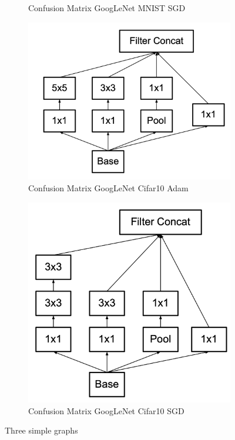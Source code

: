 \documentclass[conference]{IEEEtran}
\begin{document}
\begin{figure}[!htbp]
\begin{subfigure}[b]{0.22\textwidth}
        \caption{Confusion Matrix GoogLeNet MNIST SGD}
        \label{fig:x matrix_GoogLeNet_MNIST_SGD}
    \end{subfigure}
    \begin{subfigure}[b]{0.22\textwidth}
        \centering
        \includegraphics[width=\textwidth]{img/inceptionv1.png}
        \caption{Confusion Matrix GoogLeNet Cifar10 Adam}
        \label{fig:x matrix_GoogLeNet_CIFAR_Adam}
    \end{subfigure}
    \hfill
    \begin{subfigure}[b]{0.22\textwidth}
        \centering
        \includegraphics[width=\textwidth]{img/incetionv2.png}
        \caption{Confusion Matrix GoogLeNet Cifar10 SGD}
        \label{fig:x matrix_GoogLeNet_CIFAR_SGD}
    \end{subfigure}
    \caption{Three simple graphs}
    \label{fig:GoogLeNet Confusion Matrixis}
\end{figure}
\end{document}
